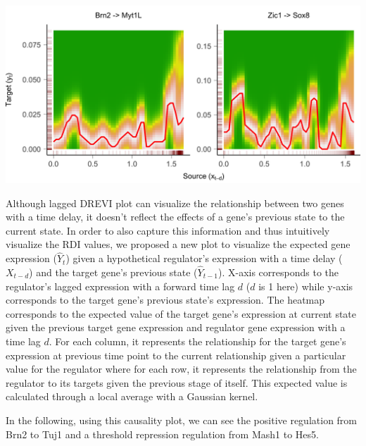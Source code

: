 \documentclass[10pt,oneside]{article}\usepackage[]{graphicx}\usepackage[]{color}
\makeatletter
\def\maxwidth{ %
  \ifdim\Gin@nat@width>\linewidth
    \linewidth
  \else
    \Gin@nat@width
  \fi
}
\newenvironment{knitrout}{}{} %
\makeatother
\begin{document}
\begin{knitrout}
{\centering \includegraphics[width=\maxwidth]{figure/plot_drevi-2} 

}



\end{knitrout}

Although lagged DREVI plot can visualize the relationship between two genes with a time delay, it doesn't reflect the effects of a gene's previous state to the current state. In order to also capture this information and thus intuitively visualize the RDI values, we proposed a new plot to visualize the expected gene expression ($\hat{Y}_t$) given a hypothetical regulator's expression with a time delay ($X_{t - d}$) and the target gene's previous state ($\hat{Y}_{t - 1}$). X-axis corresponds to the regulator's lagged expression with a forward time lag $d$ ($d$ is 1 here) while y-axis corresponds to the target gene's previous state's expression. The heatmap corresponds to the expected value of the target gene's expression at current state given the previous target gene expression and regulator gene expression with a time lag $d$. For each column, it represents the relationship for the target gene's expression at previous time point to the current relationship given a particular value for the regulator where for each row, it represents the relationship from the regulator to its targets given the previous stage of itself. This expected value is calculated through a local average with a Gaussian kernel. 
  
In the following, using this causality plot, we can see the positive regulation from Brn2 to Tuj1 and a threshold repression regulation from Mash1 to Hes5. 
\end{document}
